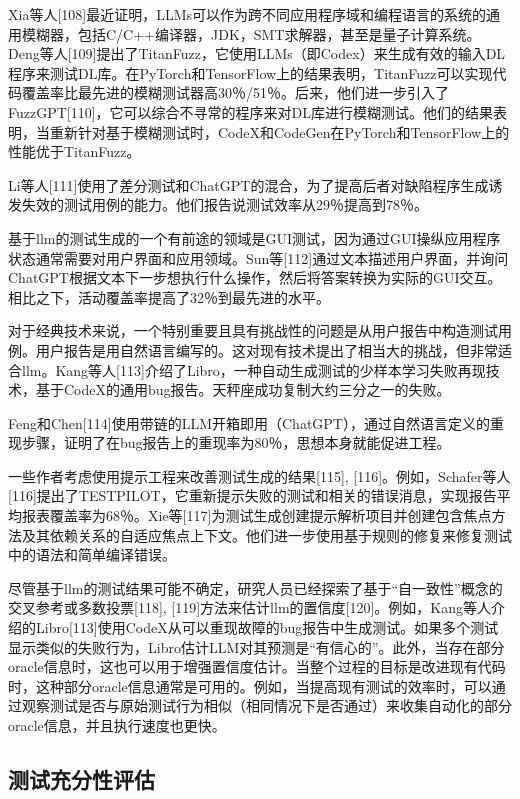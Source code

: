 \begin{translation}
Xia等人[108]最近证明，LLMs可以作为跨不同应用程序域和编程语言的系统的通用模糊器，包括C/C++编译器，JDK，SMT求解器，甚至是量子计算系统。Deng等人[109]提出了TitanFuzz，它使用LLMs（即Codex）来生成有效的输入DL程序来测试DL库。在PyTorch和TensorFlow上的结果表明，TitanFuzz可以实现代码覆盖率比最先进的模糊测试器高30％/51％。后来，他们进一步引入了FuzzGPT[110]，它可以综合不寻常的程序来对DL库进行模糊测试。他们的结果表明，当重新针对基于模糊测试时，CodeX和CodeGen在PyTorch和TensorFlow上的性能优于TitanFuzz。

Li等人[111]使用了差分测试和ChatGPT的混合，为了提高后者对缺陷程序生成诱发失效的测试用例的能力。他们报告说测试效率从29％提高到78％。

基于llm的测试生成的一个有前途的领域是GUI测试，因为通过GUI操纵应用程序状态通常需要对用户界面和应用领域。Sun等[112]通过文本描述用户界面，并询问ChatGPT根据文本下一步想执行什么操作，然后将答案转换为实际的GUI交互。相比之下，活动覆盖率提高了32％到最先进的水平。

对于经典技术来说，一个特别重要且具有挑战性的问题是从用户报告中构造测试用例。用户报告是用自然语言编写的。这对现有技术提出了相当大的挑战，但非常适合llm。Kang等人[113]介绍了Libro，一种自动生成测试的少样本学习失败再现技术，基于CodeX的通用bug报告。天秤座成功复制大约三分之一的失败。

Feng和Chen[114]使用带链的LLM开箱即用（ChatGPT），通过自然语言定义的重现步骤，证明了在bug报告上的重现率为80％，思想本身就能促进工程。

一些作者考虑使用提示工程来改善测试生成的结果[115], [116]。例如，Schafer等人[116]提出了TESTPILOT，它重新提示失败的测试和相关的错误消息，实现报告平均报表覆盖率为68％。Xie等[117]为测试生成创建提示解析项目并创建包含焦点方法及其依赖关系的自适应焦点上下文。他们进一步使用基于规则的修复来修复测试中的语法和简单编译错误。

尽管基于llm的测试结果可能不确定，研究人员已经探索了基于“自一致性”概念的交叉参考或多数投票[118], [119]方法来估计llm的置信度[120]。例如，Kang等人介绍的Libro[113]使用CodeX从可以重现故障的bug报告中生成测试。如果多个测试显示类似的失败行为，Libro估计LLM对其预测是“有信心的”。此外，当存在部分oracle信息时，这也可以用于增强置信度估计。当整个过程的目标是改进现有代码时，这种部分oracle信息通常是可用的。例如，当提高现有测试的效率时，可以通过观察测试是否与原始测试行为相似（相同情况下是否通过）来收集自动化的部分oracle信息，并且执行速度也更快。

\subsection{测试充分性评估}


\end{translation}
